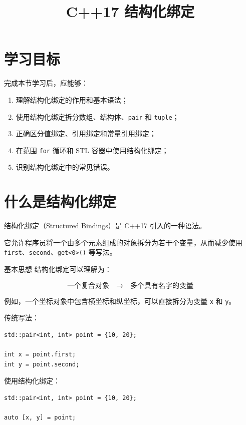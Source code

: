 \documentclass[UTF8,12pt,a4paper]{ctexart}
\title{\textbf{C++17 结构化绑定}}
\author{}
\date{}
\begin{document}
\maketitle

\section{学习目标}

完成本节学习后，应能够：

\begin{enumerate}[label=\arabic*.]
    \item 理解结构化绑定的作用和基本语法；
    \item 使用结构化绑定拆分数组、结构体、\texttt{pair} 和 \texttt{tuple}；
    \item 正确区分值绑定、引用绑定和常量引用绑定；
    \item 在范围 \texttt{for} 循环和 STL 容器中使用结构化绑定；
    \item 识别结构化绑定中的常见错误。
\end{enumerate}

\section{什么是结构化绑定}

结构化绑定（Structured Bindings）是 C++17 引入的一种语法。

它允许程序员将一个由多个元素组成的对象拆分为若干个变量，从而减少使用
\texttt{first}、\texttt{second}、\texttt{get<0>()} 等写法。

\begin{conceptbox}{基本思想}
结构化绑定可以理解为：

\[
\text{一个复合对象}
\quad \longrightarrow \quad
\text{多个具有名字的变量}
\]

例如，一个坐标对象中包含横坐标和纵坐标，可以直接拆分为变量 \texttt{x} 和 \texttt{y}。
\end{conceptbox}

传统写法：

\begin{lstlisting}
std::pair<int, int> point = {10, 20};

int x = point.first;
int y = point.second;
\end{lstlisting}

使用结构化绑定：

\begin{lstlisting}
std::pair<int, int> point = {10, 20};

auto [x, y] = point;
\end{lstlisting}
\end{document}
